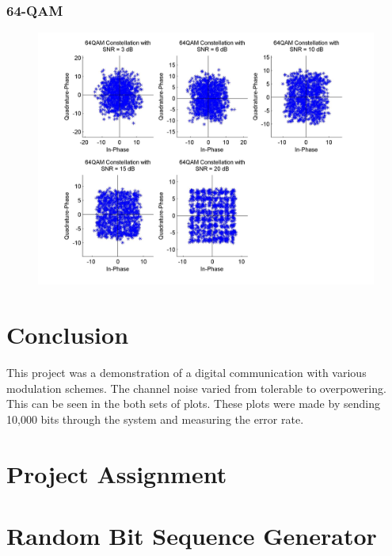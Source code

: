 \documentclass[]{article}
\begin{document}
\subsubsection{64-QAM}
\begin{figure}[H]
\centering
\includegraphics[width=\textwidth]{qam64Const.jpg}
\caption{}
\end{figure}

\section{Conclusion}
\label{sec:conc}
This project was a demonstration of a digital communication with various modulation schemes.  The channel noise varied from tolerable to overpowering.  This can be seen in the both sets of plots.  These plots were made by sending 10,000 bits through the system and measuring the error rate.

\appendix
\newpage
\section{Project Assignment}
\label{app:assign}

\cleardoublepage
\newpage


\section{Random Bit Sequence Generator}
\label{app:random_bit_generator}

\cleardoublepage
\newpage
\end{document}
